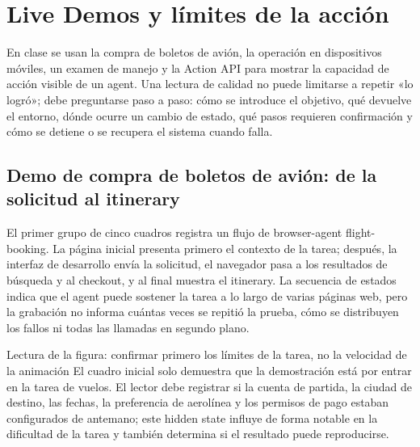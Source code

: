 \section{Live Demos y límites de la acción}

En clase se usan la compra de boletos de avión, la operación en dispositivos móviles, un examen de manejo y la Action API para mostrar la capacidad de acción visible de un agent. Una lectura de calidad no puede limitarse a repetir «lo logró»; debe preguntarse paso a paso: cómo se introduce el objetivo, qué devuelve el entorno, dónde ocurre un cambio de estado, qué pasos requieren confirmación y cómo se detiene o se recupera el sistema cuando falla.

\subsection{Demo de compra de boletos de avión: de la solicitud al itinerary}

El primer grupo de cinco cuadros registra un flujo de browser-agent flight-booking. La página inicial presenta primero el contexto de la tarea; después, la interfaz de desarrollo envía la solicitud, el navegador pasa a los resultados de búsqueda y al checkout, y al final muestra el itinerary. La secuencia de estados indica que el agent puede sostener la tarea a lo largo de varias páginas web, pero la grabación no informa cuántas veces se repitió la prueba, cómo se distribuyen los fallos ni todas las llamadas en segundo plano.


\begin{knowledgebox}{Lectura de la figura: confirmar primero los límites de la tarea, no la velocidad de la animación}
El cuadro inicial solo demuestra que la demostración está por entrar en la tarea de vuelos. El lector debe registrar si la cuenta de partida, la ciudad de destino, las fechas, la preferencia de aerolínea y los permisos de pago estaban configurados de antemano; este hidden state influye de forma notable en la dificultad de la tarea y también determina si el resultado puede reproducirse.
\end{knowledgebox}


